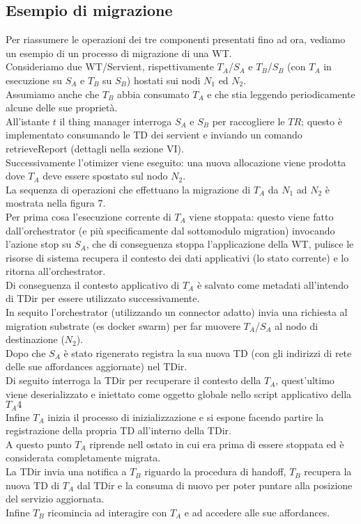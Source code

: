 \documentclass[11pt]{article}
\begin{document}
		\subsection{Esempio di migrazione}
		Per riassumere le operazioni dei tre componenti presentati fino ad ora, vediamo un esempio di un processo di migrazione di una WT. \\
		Consideriamo due WT/Servient, rispettivamente $T_A$/$S_A$ e $T_B$/$S_B$ (con $T_A$ in esecuzione su $S_A$ e $T_B$ su $S_B$) hostati sui nodi $N_1$ ed $N_2$. \\
		Assumiamo anche che $T_B$ abbia consumato $T_A$ e che stia leggendo periodicamente alcune delle sue proprietà. \\
		All'istante $t$ il thing manager interroga $S_A$ e $S_B$ per raccogliere le $TR$; questo è implementato consumando le TD dei servient e inviando un comando retrieveReport (dettagli nella sezione VI). \\
		Successivamente l'otimizer viene eseguito: una nuova allocazione viene prodotta dove $T_A$ deve essere spostato sul nodo $N_2$. \\
		La sequenza di operazioni che effettuano la migrazione di $T_A$ da $N_1$ ad $N_2$ è mostrata nella figura 7. \\
		Per prima cosa l'esecuzione corrente di $T_A$ viene stoppata: questo viene fatto dall'orchestrator (e più specificamente dal sottomodulo migration) invocando l'azione stop su $S_A$, che di conseguenza stoppa l'applicazione della WT, pulisce le risorse di sistema recupera il contesto dei dati applicativi (lo stato corrente) e lo ritorna all'orchestrator. \\
		Di conseguenza il contesto applicativo di $T_A$ è salvato come metadati all'intendo di TDir per essere utilizzato successivamente. \\
		In sequito l'orchestrator (utilizzando un connector adatto) invia una richiesta al migration substrate (es docker swarm) per far muovere $T_A$/$S_A$ al nodo di destinazione ($N_2$). \\
		Dopo che $S_A$ è stato rigenerato registra la sua nuova TD (con gli indirizzi di rete delle sue affordances aggiornate) nel TDir. \\
		Di seguito interroga la TDir per recuperare il contesto della $T_A$, quest'ultimo viene deserializzato e iniettato come oggetto globale nello script applicativo della $T_A4$ \\
		Infine $T_A$ inizia il processo di inizializzazione e si espone facendo partire la registrazione della propria TD all'interno della TDir. \\
		A questo punto $T_A$ riprende nell ostato in cui era prima di essere stoppata ed è considerata completamente migrata. \\
		La TDir invia una notifica a $T_B$ riguardo la procedura di handoff, $T_B$ recupera la nuova TD di $T_A$ dal TDir e la consuma di nuovo per poter puntare alla posizione del servizio aggiornata. \\
		Infine $T_B$ ricomincia ad interagire con $T_A$ e ad accedere alle sue affordances. \\
		
\end{document}
